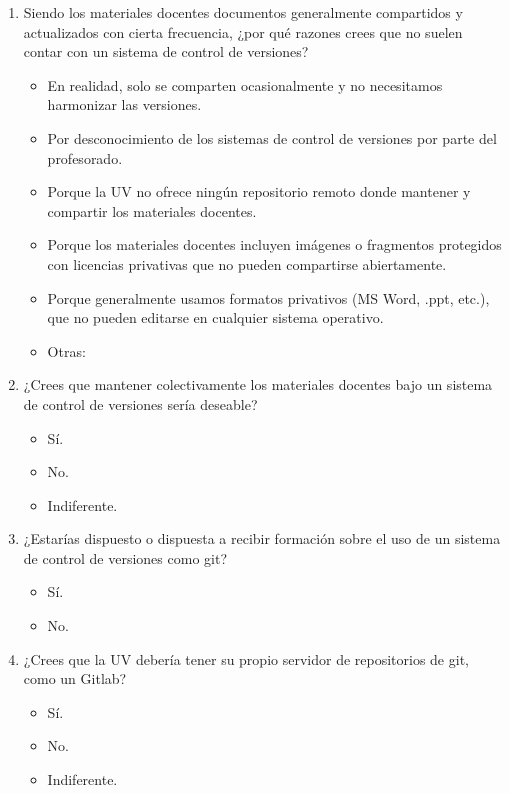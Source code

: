 \documentclass[a4paper,12pt]{article}
\begin{document}
\begin{enumerate}
   \begin{enumerate}
   \item Siendo los materiales docentes documentos generalmente compartidos y actualizados con cierta
         frecuencia, ¿por qué razones crees que no suelen contar con un sistema de control de versiones?
      \begin{itemize}
      \item En realidad, solo se comparten ocasionalmente y no necesitamos harmonizar las versiones.
      \item Por desconocimiento de los sistemas de control de versiones por parte del profesorado.
      \item Porque la UV no ofrece ningún repositorio remoto donde mantener y compartir los materiales
            docentes.
      \item Porque los materiales docentes incluyen imágenes o fragmentos protegidos con licencias
            privativas que no pueden compartirse abiertamente.
      \item Porque generalmente usamos formatos privativos (MS Word, .ppt, etc.), que no pueden
            editarse en cualquier sistema operativo.
      \item Otras:
      \vspace*{1cm}
      \end{itemize}

   \item ¿Crees que mantener colectivamente los materiales docentes bajo un sistema de control de
         versiones sería deseable?
      \begin{itemize}
      \item Sí.
      \item No.
      \item Indiferente.
      \end{itemize}

   \item ¿Estarías dispuesto o dispuesta a recibir formación sobre el uso de un sistema de control de
         versiones como \textsf{git}?
      \begin{itemize}
      \item Sí.
      \item No.
      \end{itemize}

   \item ¿Crees que la UV debería tener su propio servidor de repositorios de \textsf{git}, como un
         Gitlab? \cite{Paderborn2023,PereiraBraga2023}
      \begin{itemize}
      \item Sí.
      \item No.
      \item Indiferente.
      \end{itemize}
   \end{enumerate}


\end{enumerate}
\end{document}
